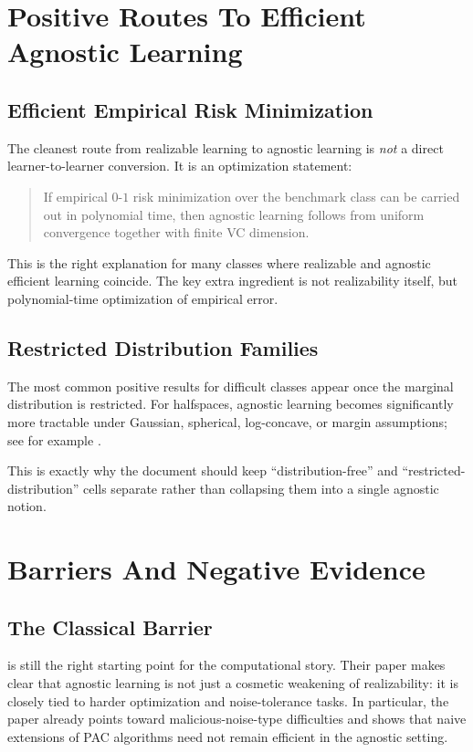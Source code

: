 \section{Positive Routes To Efficient Agnostic Learning}

\subsection{Efficient Empirical Risk Minimization}

The cleanest route from realizable learning to agnostic learning is \emph{not} a direct learner-to-learner conversion. It is an optimization statement:

\begin{quote}
If empirical $0$-$1$ risk minimization over the benchmark class can be carried out in polynomial time, then agnostic learning follows from uniform convergence together with finite VC dimension.
\end{quote}

This is the right explanation for many classes where realizable and agnostic efficient learning coincide. The key extra ingredient is not realizability itself, but polynomial-time optimization of empirical error.

\subsection{Restricted Distribution Families}

The most common positive results for difficult classes appear once the marginal distribution is restricted. For halfspaces, agnostic learning becomes significantly more tractable under Gaussian, spherical, log-concave, or margin assumptions; see for example \citet{kalai2008agnostically, daniely2015, diakonikolas2021}.

This is exactly why the document should keep ``distribution-free'' and ``restricted-distribution'' cells separate rather than collapsing them into a single agnostic notion.

\section{Barriers And Negative Evidence}

\subsection{The Classical Barrier}

\citet{kearns1994} is still the right starting point for the computational story. Their paper makes clear that agnostic learning is not just a cosmetic weakening of realizability: it is closely tied to harder optimization and noise-tolerance tasks. In particular, the paper already points toward malicious-noise-type difficulties and shows that naive extensions of PAC algorithms need not remain efficient in the agnostic setting.

